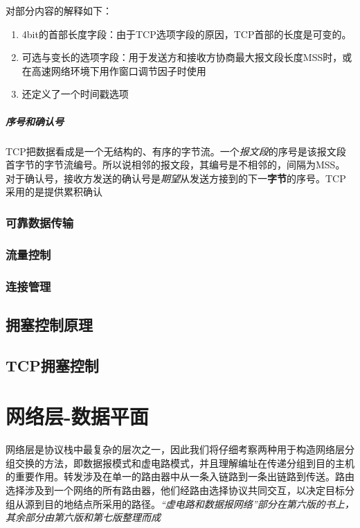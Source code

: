 \documentclass[]{report}
\begin{document}
\begin{figure}[h!]
\begin{minipage}{20em}
				\end{minipage}
			\end{figure}
			对部分内容的解释如下：
			\begin{enumerate}
				\item 4bit的首部长度字段：由于TCP选项字段的原因，TCP首部的长度是可变的。
				\item 可选与变长的选项字段：用于发送方和接收方协商最大报文段长度MSS时，或在高速网络环境下用作窗口调节因子时使用
				\item 还定义了一个时间戳选项
			\end{enumerate}
			\paragraph{序号和确认号}
			TCP把数据看成是一个无结构的、有序的字节流。一个\textit{报文段}的序号是该报文段首字节的字节流编号。所以说相邻的报文段，其编号是不相邻的，间隔为MSS。对于确认号，接收方发送的确认号是\textit{期望}从发送方接到的下一\textbf{字节}的序号。TCP采用的是提供累积确认
		\subsection{可靠数据传输}
		\subsection{流量控制}
		\subsection{连接管理}
	\section{拥塞控制原理}
	\section{TCP拥塞控制}

	\chapter{网络层-数据平面}
	网络层是协议栈中最复杂的层次之一，因此我们将仔细考察两种用于构造网络层分组交换的方法，即数据报模式和虚电路模式，并且理解编址在传递分组到目的主机的重要作用。转发涉及在单一的路由器中从一条入链路到一条出链路到传送。路由选择涉及到一个网络的所有路由器，他们经路由选择协议共同交互，以决定目标分组从源到目的地结点所采用的路径。\textit{“虚电路和数据报网络”部分在第六版的书上，其余部分由第六版和第七版整理而成}
\end{document}
